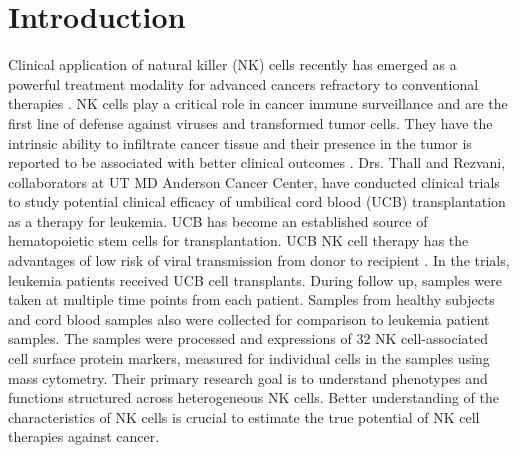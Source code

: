 \documentclass[12pt,]{article}
\begin{document}
\section{Introduction}
Clinical application of natural killer (NK) cells %
recently has emerged as a powerful treatment modality for advanced cancers refractory to conventional therapies \citep{rezvani2015application}. %
NK cells play a critical role in cancer immune surveillance and are the first line of defense against viruses and transformed tumor cells.
They have the intrinsic ability to infiltrate cancer tissue and their presence in the tumor is reported to be associated with better clinical outcomes \citep{suck2016natural}.  %
Drs. Thall and Rezvani, collaborators at UT MD Anderson Cancer Center, have conducted clinical trials to study potential clinical efficacy of umbilical cord blood (UCB) transplantation as a therapy for leukemia.  UCB has become an established source of hematopoietic stem cells for transplantation. UCB NK cell therapy has the advantages of low risk of viral transmission from donor to recipient \citep{sarvaria2017umbilical}. In the trials, leukemia patients received UCB cell transplants. %
During follow up, samples were taken at multiple time points from each patient.  Samples from %
healthy subjects and cord blood samples also were collected for comparison to leukemia patient samples.
The samples were processed and expressions of 32 NK cell-associated cell surface protein markers, %
measured for individual cells in the samples using mass cytometry.
Their primary research goal is to understand phenotypes and functions structured across heterogeneous NK cells. %
Better understanding of the characteristics of NK cells is crucial to estimate the true potential of NK cell therapies against cancer.  %
\end{document}
